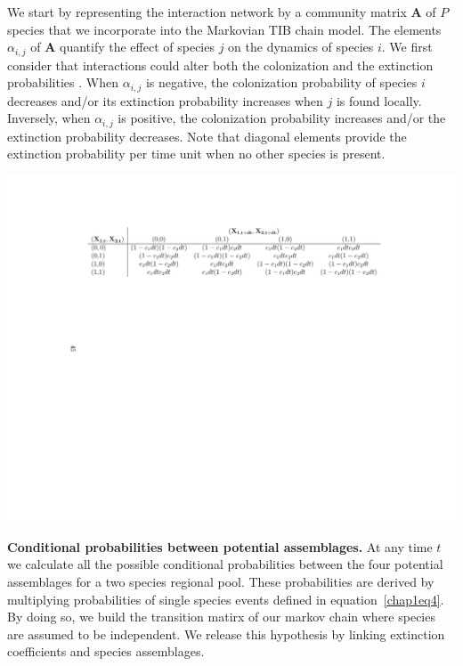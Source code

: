 We start by representing the interaction network by a community matrix $\mathbf{A}$ of $P$ species that we incorporate into the Markovian TIB chain model. The elements $\alpha_{i,j}$ of $\mathbf{A}$ quantify the effect of species $j$ on the dynamics of species $i$. We first consider that interactions could alter both the colonization and the extinction probabilities \citep{Gravel2011}. When $\alpha_{i,j}$ is negative, the colonization probability of species $i$ decreases and/or its extinction probability increases when $j$ is found locally. Inversely, when $\alpha_{i,j}$ is positive, the colonization probability increases and/or the extinction probability decreases. Note that diagonal elements provide the extinction probability per time unit when no other species is present.

\begin{table}[h!]
\centering
\includegraphics[scale=0.85]{./chapitre1/table1.pdf}
\caption{\textbf{Conditional probabilities between potential assemblages.} At any time $t$ we calculate all the possible conditional probabilities between the four potential assemblages for a two species regional pool. These probabilities are derived by multiplying probabilities of single species events defined in equation~\eqref{chap1eq4}. By doing so, we build the transition matirx of our markov chain where species are assumed to be independent. We release this hypothesis by linking extinction coefficients and species assemblages.}
\label{tb1}
\end{table}

